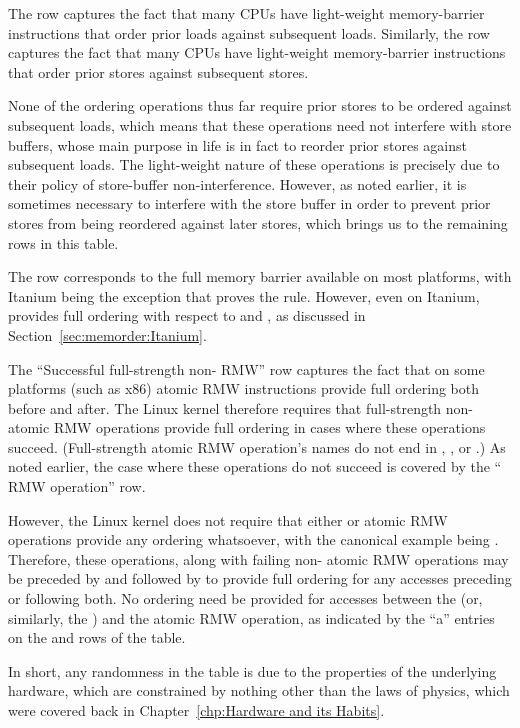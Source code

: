 {	The  row captures the fact that many CPUs have
	light-weight memory-barrier instructions that order prior loads against
	subsequent loads.
	Similarly,
	the  row captures the fact that many CPUs have
	light-weight memory-barrier instructions that order prior stores against
	subsequent stores.

	None of the ordering operations thus far require prior stores to be
	ordered against subsequent loads, which means that these operations
	need not interfere with store buffers, whose main purpose in life
	is in fact to reorder prior stores against subsequent loads.
	The light-weight nature of these operations is precisely due to
	their policy of store-buffer non-interference.
	However, as noted earlier, it is sometimes necessary to interfere
	with the store buffer in order to prevent prior stores from being
	reordered against later stores, which brings us to the remaining
	rows in this table.

	The  row corresponds to the full memory barrier
	available on most platforms, with Itanium being the exception
	that proves the rule.
	However, even on Itanium,  provides full ordering
	with respect to  and ,
	as discussed in Section~\ref{sec:memorder:Itanium}.

	The ``Successful full-strength non- RMW'' row captures
	the fact that on some platforms (such as x86) atomic RMW instructions
	provide full ordering both before and after.
	The Linux kernel therefore requires that full-strength non-
	atomic RMW operations provide full ordering in cases where these
	operations succeed.
	(Full-strength atomic RMW operation's names do not end in
	, , or .)
	As noted earlier, the case where these operations do not succeed
	is covered by the `` RMW operation'' row.

	However, the Linux kernel does not require that either 
	or  atomic RMW operations provide any ordering
	whatsoever, with the canonical example being .
	Therefore, these operations, along with failing non-
	atomic RMW operations may be preceded by 
	and followed by  to provide full
	ordering for any accesses preceding or following both.
	No ordering need be provided for accesses between the
	 (or, similarly, the
	) and the atomic RMW operation, as
	indicated by the ``a'' entries on the 
	and  rows of the table.

	In short, any randomness in the table is due to the properties
	of the underlying hardware, which are constrained by nothing other
	than the laws of physics, which were covered back in
	Chapter~\ref{chp:Hardware and its Habits}.
} \QuickQuizEnd


